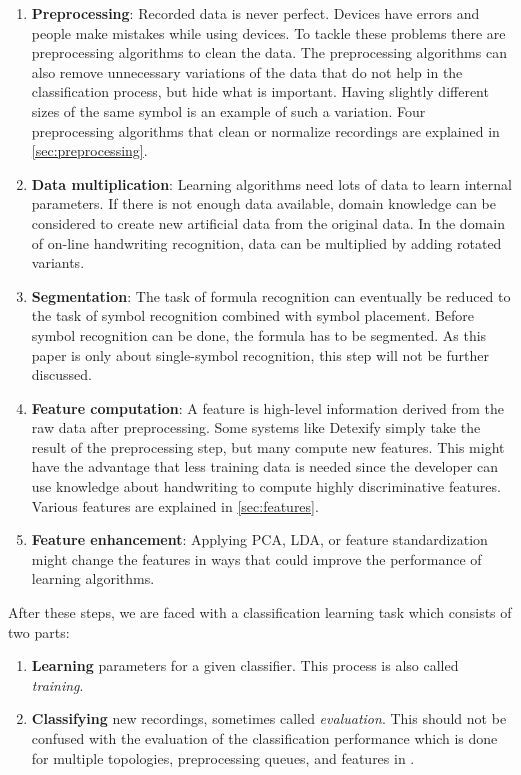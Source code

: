 \documentclass[9pt,technote]{IEEEtran}
\begin{document}
\begin{enumerate}
    \item \textbf{Preprocessing}: Recorded data is never perfect. Devices have
          errors and people make mistakes while using devices. To tackle these
          problems there are preprocessing algorithms to clean the data. The
          preprocessing algorithms can also remove unnecessary variations of
          the data that do not help in the classification process, but hide
          what is important. Having slightly different sizes of the same symbol
          is an example of such a variation. Four preprocessing algorithms that
          clean or normalize recordings are explained in
          \cref{sec:preprocessing}.
    \item \textbf{Data multiplication}: Learning algorithms need lots of data
          to learn internal parameters. If there is not enough data available,
          domain knowledge can be considered to create new artificial data from
          the original data. In the domain of on-line handwriting recognition,
          data can be multiplied by adding rotated variants.
    \item \textbf{Segmentation}: The task of formula recognition can eventually
          be reduced to the task of symbol recognition combined with symbol
          placement. Before symbol recognition can be done, the formula has
          to be segmented. As this paper is only about single-symbol
          recognition, this step will not be further discussed.
    \item \textbf{Feature computation}: A feature is high-level information
          derived from the raw data after preprocessing. Some systems like
          Detexify simply take the result of the preprocessing step, but many
          compute new features. This might have the advantage that less
          training data is needed since the developer can use knowledge about
          handwriting to compute highly discriminative features. Various
          features are explained in \cref{sec:features}.
    \item \textbf{Feature enhancement}: Applying PCA, LDA, or
          feature standardization might change the features in ways that could
          improve the performance of learning algorithms.
\end{enumerate}

After these steps, we are faced with a classification learning task which consists of
two parts:
\begin{enumerate}
    \item \textbf{Learning} parameters for a given classifier. This process is
          also called \textit{training}.
    \item \textbf{Classifying} new recordings, sometimes called
          \textit{evaluation}. This should not be confused with the evaluation
          of the classification performance which is done for multiple
          topologies, preprocessing queues, and features in .
\end{enumerate}
\end{document}
